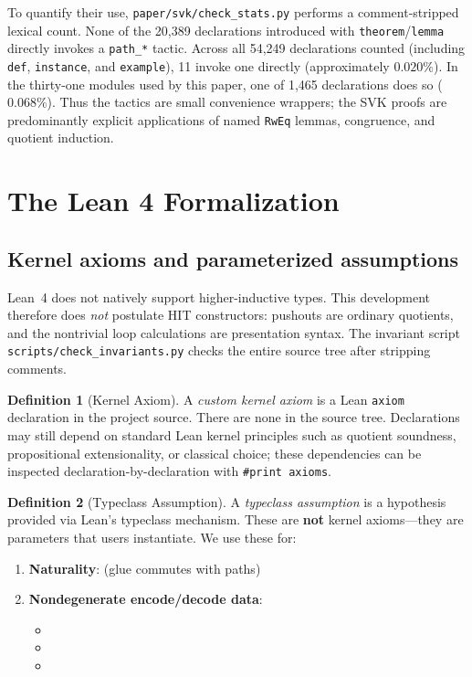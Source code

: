 \documentclass{lmcs}
\theoremstyle{definition}
\newtheorem{definition}{Definition}[section]
\theoremstyle{plain}
\theoremstyle{remark}
\begin{document}
To quantify their use, \texttt{paper/svk/check\_stats.py} performs a
comment-stripped lexical count.  None of the 20,389 declarations introduced with
\texttt{theorem}/\texttt{lemma} directly invokes a \texttt{path\_*} tactic.
Across all 54,249 declarations counted (including \texttt{def},
\texttt{instance}, and \texttt{example}), 11 invoke one directly
(approximately \(0.020\%\)).  In the thirty-one modules used by this paper,
one of 1,465 declarations does so (\(0.068\%\)).  Thus the tactics are
small convenience wrappers; the SVK proofs are predominantly explicit
applications of named \texttt{RwEq} lemmas, congruence, and quotient induction.

\section{The Lean 4 Formalization}
\label{sec:lean}

\subsection{Kernel axioms and parameterized assumptions}

Lean~4 does not natively support higher-inductive types.  This development
therefore does \emph{not} postulate HIT constructors: pushouts are
ordinary quotients, and the nontrivial loop calculations are presentation
syntax.  The invariant script
\texttt{scripts/check\_invariants.py} checks the entire source tree after
stripping comments.

\begin{definition}[Kernel Axiom]
A \emph{custom kernel axiom} is a Lean \texttt{axiom} declaration in the
project source.  There are none in the source tree.  Declarations may
still depend on standard Lean kernel principles such as quotient soundness,
propositional extensionality, or classical choice; these dependencies can be
inspected declaration-by-declaration with \texttt{\#print axioms}.
\end{definition}

\begin{definition}[Typeclass Assumption]
A \emph{typeclass assumption} is a hypothesis provided via Lean's typeclass mechanism. These are \textbf{not} kernel axioms---they are parameters that users instantiate. We use these for:
\begin{enumerate}
    \item \textbf{Naturality}:  (glue commutes with paths)
    \item \textbf{Nondegenerate encode/decode data}:
    \begin{itemize}
        \item {}
        \item {}
        \item {}
    \end{itemize}
\end{enumerate}
\end{definition}
\end{document}
